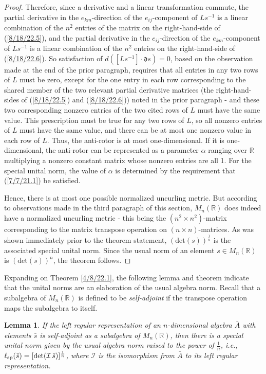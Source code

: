 \documentclass{amsart}
\numberwithin{equation}{section}
\newtheorem{lemma}[theorem]{Lemma}
\theoremstyle{definition}
\numberwithin{theorem}{section}
\begin{document}
\begin{proof}
Therefore, since a derivative and a linear transformation commute, the partial derivative in the $e_{km}$-direction of the $e_{ij}$-component of $Ls^{-1}$ is a linear combination of the $n^2$ entries of the matrix on the right-hand-side of (\ref{8/18/22.5}), and  the partial derivative in the $e_{ij}$-direction of the $e_{km}$-component of $Ls^{-1}$ is a linear combination of the $n^2$ entries on the right-hand-side of (\ref{8/18/22.6}).
So satisfaction of \mbox{$d\left([Ls^{-1}]\cdot \mathfrak{d}s\right) = 0$,} based on the observation made at the end of the prior paragraph, requires that all entries in any two rows of $L$ must be zero, except for the one entry in each row corresponding to the shared member of the two relevant partial derivative matrices (the right-hand-sides of (\ref{8/18/22.5}) and (\ref{8/18/22.6})) noted in the prior paragraph - and these two corresponding nonzero entries of the two cited rows of $L$ must have the same value.  This prescription must be true for any two rows of $L$, so all nonzero entries of $L$ must have the same value, and there can be at most one nonzero value in each row of $L$.  Thus, the anti-rotor is at most one-dimensional. If it is one-dimensional, the anti-rotor can be represented as a parameter $\alpha$ ranging over $\mathbb{R}$ multiplying a nonzero constant matrix whose nonzero entries are all 1.  
For the special unital norm, the value of $\alpha$ is determined by the requirement that (\ref{7/7/21.1}) be satisfied. 


Hence, there is at most one possible normalized uncurling metric.  But according to observations made in the third paragraph of this section, $ M_n(\mathbb{R})$ does indeed have a normalized uncurling metric - this being the $(n^2\times n^2)$-matrix corresponding to the matrix transpose operation on $(n\times n)$-matrices.  As was shown immediately prior to the theorem statement, $(\mbox{det}(s))^{\frac{1}{n}}$ is the associated special unital norm.  Since the usual norm of an element $s\in M_n(\mathbb{R})$ is $(\mbox{det}(s))^n$, the theorem follows.
 \end{proof}
 
 Expanding on Theorem \ref{4/8/22.1}, the following lemma and theorem indicate that the unital norms are an elaboration of the usual algebra norm.  Recall that a subalgebra of $M_n(\mathbb{R})$ is defined to be {\it self-adjoint} if the transpose operation maps the subalgebra to itself.
 
  \begin{lemma}\label{5/13/22.1} If the left regular representation of an $n$-dimensional algebra $\bar{A}$ with elements $\bar{s}$ is self-adjoint as a subalgebra of $M_n(\mathbb{R})$, then there is a special unital norm given by the usual algebra norm raised to the power of $\frac{1}{n}$, i.e., $\ell_{\rm sp}(\bar{s}) = [{\rm det}(\mathcal{I}\, \bar{s})]^\frac{1}{n}$, where $\mathcal{I}$ is the isomorphism from $\bar{A}$ to its left regular representation.
\end{lemma}
\end{document}
